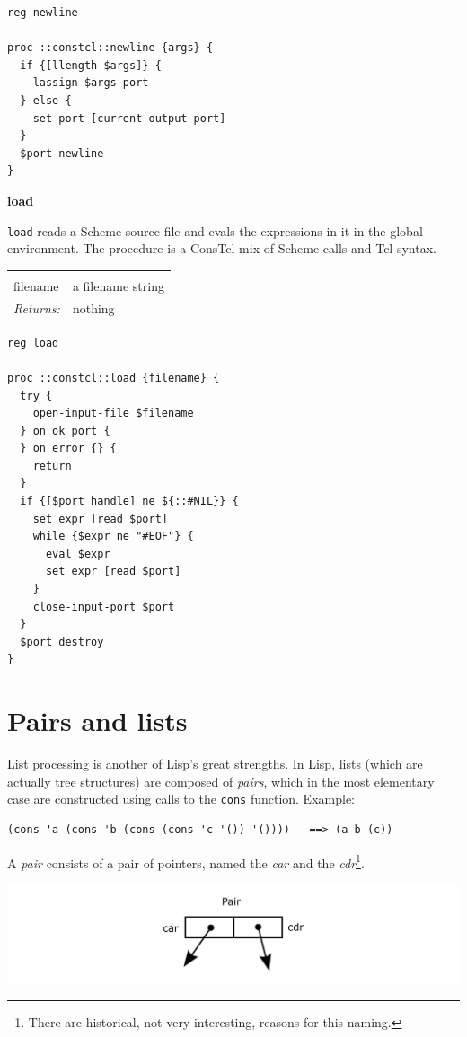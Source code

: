 \documentclass[twoside]{report}
\begin{document}
\begin{lstlisting}
reg newline

proc ::constcl::newline {args} {
  if {[llength $args]} {
    lassign $args port
  } else {
    set port [current-output-port]
  }
  $port newline
}
\end{lstlisting}

\textbf{load}

\texttt{load} reads a Scheme source file and evals the expressions in it in the global environment. The procedure is a ConsTcl mix of Scheme calls and Tcl syntax.

\noindent\begin{tabular}{ |p{1.9cm} p{8cm}| }
\hline
\rowcolor[HTML]{CCCCCC} \multicolumn{2}{|l|}{\bf load (public)} \\
filename & a filename string \\
\textit{Returns:} & nothing \\
\hline
\end{tabular}

\begin{lstlisting}
reg load

proc ::constcl::load {filename} {
  try {
    open-input-file $filename
  } on ok port {
  } on error {} {
    return
  }
  if {[$port handle] ne ${::#NIL}} {
    set expr [read $port]
    while {$expr ne "#EOF"} {
      eval $expr
      set expr [read $port]
    }
    close-input-port $port
  }
  $port destroy
}
\end{lstlisting}

\section{Pairs and lists}
\label{pairs-and-lists}

List processing is another of Lisp's great strengths. In Lisp, lists (which are actually tree structures) are composed of \emph{pairs}, which in the most elementary case are constructed using calls to the \texttt{cons} function. Example:

\begin{verbatim}
(cons 'a (cons 'b (cons (cons 'c '()) '())))   ==> (a b (c))
\end{verbatim}

A \emph{pair} consists of a pair of pointers, named the \emph{car} and the \emph{cdr}\footnote{There are historical, not very interesting, reasons for this naming.}.

\includegraphics{images/pair.png}
\end{document}
